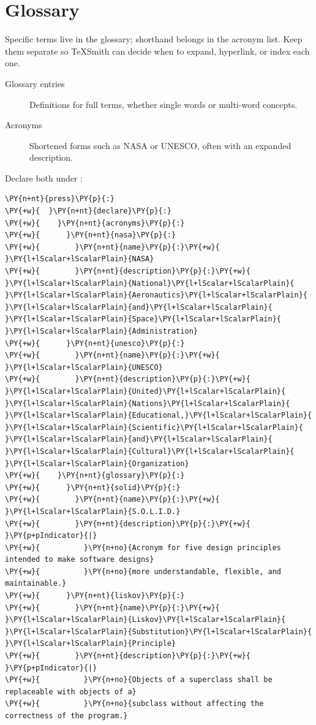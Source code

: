 \documentclass[a4paper,twoside]{article}
\begin{document}
\section{Glossary}
Specific terms live in the glossary; shorthand belongs in the acronym list. Keep
them separate so TeXSmith can decide when to expand, hyperlink, or index each
one.
\begin{description}
\item[{Glossary entries}] Definitions for full terms, whether single words or multi-word concepts.
\item[{Acronyms}] Shortened forms such as NASA or UNESCO, often with an expanded description.
\end{description}
Declare both under :
\begin{tscode}[lang=yaml, engine=pygments]
\begin{Verbatim}[commandchars=\\\{\},breaklines, breakanywhere, commandchars=\\\{\}]
\PY{n+nt}{press}\PY{p}{:}
\PY{+w}{  }\PY{n+nt}{declare}\PY{p}{:}
\PY{+w}{    }\PY{n+nt}{acronyms}\PY{p}{:}
\PY{+w}{      }\PY{n+nt}{nasa}\PY{p}{:}
\PY{+w}{        }\PY{n+nt}{name}\PY{p}{:}\PY{+w}{ }\PY{l+lScalar+lScalarPlain}{NASA}
\PY{+w}{        }\PY{n+nt}{description}\PY{p}{:}\PY{+w}{ }\PY{l+lScalar+lScalarPlain}{National}\PY{l+lScalar+lScalarPlain}{ }\PY{l+lScalar+lScalarPlain}{Aeronautics}\PY{l+lScalar+lScalarPlain}{ }\PY{l+lScalar+lScalarPlain}{and}\PY{l+lScalar+lScalarPlain}{ }\PY{l+lScalar+lScalarPlain}{Space}\PY{l+lScalar+lScalarPlain}{ }\PY{l+lScalar+lScalarPlain}{Administration}
\PY{+w}{      }\PY{n+nt}{unesco}\PY{p}{:}
\PY{+w}{        }\PY{n+nt}{name}\PY{p}{:}\PY{+w}{ }\PY{l+lScalar+lScalarPlain}{UNESCO}
\PY{+w}{        }\PY{n+nt}{description}\PY{p}{:}\PY{+w}{ }\PY{l+lScalar+lScalarPlain}{United}\PY{l+lScalar+lScalarPlain}{ }\PY{l+lScalar+lScalarPlain}{Nations}\PY{l+lScalar+lScalarPlain}{ }\PY{l+lScalar+lScalarPlain}{Educational,}\PY{l+lScalar+lScalarPlain}{ }\PY{l+lScalar+lScalarPlain}{Scientific}\PY{l+lScalar+lScalarPlain}{ }\PY{l+lScalar+lScalarPlain}{and}\PY{l+lScalar+lScalarPlain}{ }\PY{l+lScalar+lScalarPlain}{Cultural}\PY{l+lScalar+lScalarPlain}{ }\PY{l+lScalar+lScalarPlain}{Organization}
\PY{+w}{    }\PY{n+nt}{glossary}\PY{p}{:}
\PY{+w}{      }\PY{n+nt}{solid}\PY{p}{:}
\PY{+w}{        }\PY{n+nt}{name}\PY{p}{:}\PY{+w}{ }\PY{l+lScalar+lScalarPlain}{S.O.L.I.D.}
\PY{+w}{        }\PY{n+nt}{description}\PY{p}{:}\PY{+w}{ }\PY{p+pIndicator}{|}
\PY{+w}{          }\PY{n+no}{Acronym for five design principles intended to make software designs}
\PY{+w}{          }\PY{n+no}{more understandable, flexible, and maintainable.}
\PY{+w}{      }\PY{n+nt}{liskov}\PY{p}{:}
\PY{+w}{        }\PY{n+nt}{name}\PY{p}{:}\PY{+w}{ }\PY{l+lScalar+lScalarPlain}{Liskov}\PY{l+lScalar+lScalarPlain}{ }\PY{l+lScalar+lScalarPlain}{Substitution}\PY{l+lScalar+lScalarPlain}{ }\PY{l+lScalar+lScalarPlain}{Principle}
\PY{+w}{        }\PY{n+nt}{description}\PY{p}{:}\PY{+w}{ }\PY{p+pIndicator}{|}
\PY{+w}{          }\PY{n+no}{Objects of a superclass shall be replaceable with objects of a}
\PY{+w}{          }\PY{n+no}{subclass without affecting the correctness of the program.}
\end{Verbatim}
\end{tscode}
\end{document}
